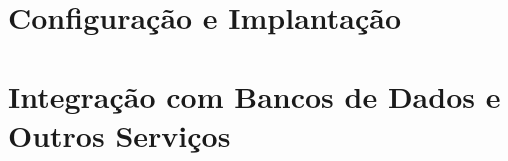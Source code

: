 \section{Configuração e Implantação}
\section{Integração com Bancos de Dados e Outros Serviços}










